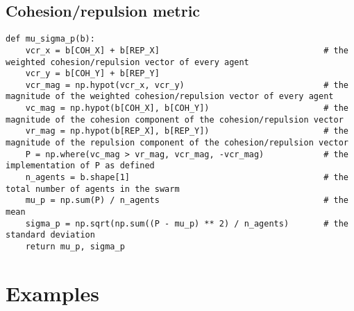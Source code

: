 \documentclass{article}
\begin{document}
\subsection{Cohesion/repulsion metric}
\begin{verbatim}
def mu_sigma_p(b):
    vcr_x = b[COH_X] + b[REP_X]                                 # the weighted cohesion/repulsion vector of every agent
    vcr_y = b[COH_Y] + b[REP_Y]
    vcr_mag = np.hypot(vcr_x, vcr_y)                            # the magnitude of the weighted cohesion/repulsion vector of every agent
    vc_mag = np.hypot(b[COH_X], b[COH_Y])                       # the magnitude of the cohesion component of the cohesion/repulsion vector
    vr_mag = np.hypot(b[REP_X], b[REP_Y])                       # the magnitude of the repulsion component of the cohesion/repulsion vector
    P = np.where(vc_mag > vr_mag, vcr_mag, -vcr_mag)            # the implementation of P as defined
    n_agents = b.shape[1]                                       # the total number of agents in the swarm
    mu_p = np.sum(P) / n_agents                                 # the mean
    sigma_p = np.sqrt(np.sum((P - mu_p) ** 2) / n_agents)       # the standard deviation
    return mu_p, sigma_p
\end{verbatim}

\section{Examples}
\end{document}
